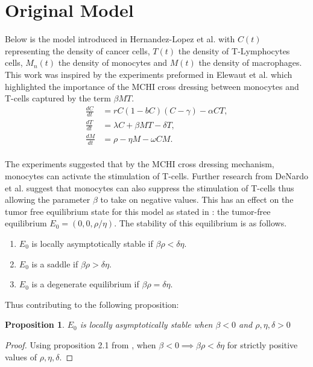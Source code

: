 \documentclass[11pt]{article}
\newtheorem{proposition}{Proposition}
\theoremstyle{definition}
\begin{document}
\section{Original Model}
Below is the model introduced in Hernandez-Lopez et al. \parencite{ERX2026} with $C(t)$ representing the density of cancer cells, $T(t)$ the density of T-Lymphocytes cells, $M_n(t)$ the density of monocytes and 
$M(t)$ the density of macrophages. This work was inspired by the experiments preformed in Elewaut et al. \parencite{El2024} which highlighted the importance of the MCHI cross dressing between monocytes and T-cells 
captured by the term $\beta MT$.
\\
$$
\begin{aligned}
\frac{dC}{dt} &= rC (1 - bC) (C - \gamma) - \alpha CT, \\
\frac{dT}{dt} &= \lambda C + \beta MT - \delta T, \\
\frac{dM}{dt} &= \rho - \eta M - \omega CM.
\end{aligned}
$$
\\
The experiments suggested that by the MCHI cross dressing mechanism, monocytes can activate the stimulation of T-cells. Further research from DeNardo et al. \parencite{DeNardo2019}
suggest that monocytes can also suppress the stimulation of T-cells thus allowing the parameter $\beta$ to take on negative values. This has an effect on the tumor free equilibrium state for this model as stated in \parencite{ERX2026}: 
the tumor-free equilibrium $E_0 = (0, 0, \rho/\eta)$. The stability of this equilibrium is as follows.
\begin{enumerate}
  \item[\textbf{(a)}] $E_0$ is locally asymptotically stable if $\beta\rho < \delta\eta$.
  \item[\textbf{(b)}] $E_0$ is a saddle if $\beta\rho > \delta\eta$.
  \item[\textbf{(c)}] $E_0$ is a degenerate equilibrium if $\beta\rho = \delta\eta$.
\end{enumerate}
Thus contributing to the following proposition: 
\begin{proposition}
$E_0$ is locally asymptotically stable when $\beta<0$ and $\rho, \eta, \delta >0$
\end{proposition}
\begin{proof}
Using proposition 2.1 from \parencite{ERX2026}, when $\beta < 0 \implies \beta\rho < \delta\eta$ for strictly positive values of $\rho, \eta, \delta$.
\end{proof}
\end{document}
